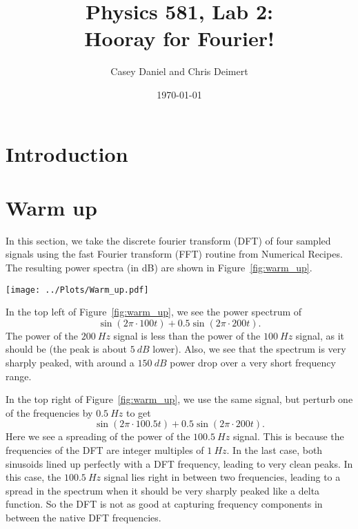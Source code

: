 \documentclass[twocolumn]{myarticle}
\begin{document}
\title{Physics 581, Lab 2:\\Hooray for Fourier!}
\author{Casey Daniel and Chris Deimert}
\date{\today}

\maketitle

\section{Introduction}
\label{sec:introduction}

\section{Warm up}
\label{sec:warm_up}

In this section, we take the discrete fourier transform (DFT) of four sampled signals using the fast Fourier transform (FFT) routine from Numerical Recipes.
The resulting power spectra (in dB) are shown in Figure~\ref{fig:warm_up}.

\begin{figure*}[htpb]
    \centering
    \texttt{[image: ../Plots/Warm\_up.pdf]}
    \caption{%
        The power spectra of the DFT's of four signals.
        Each signal was sampled at $ t = i/1024 $ for $ i = 1, 2, \ldots, 1024 $.
        The frequencies resulting from the discrete Fourier transform are then $ f = -511, -510, \ldots, 512 $.
    }
    \label{fig:warm_up}
\end{figure*}

In the top left of Figure~\ref{fig:warm_up}, we see the power spectrum of 
\[ 
    \sin(2 \pi \cdot 100 t) + 0.5 \sin (2 \pi \cdot 200 t) . 
\]
The power of the $ \SI{200}{Hz} $ signal is less than the power of the $ \SI{100}{Hz} $ signal, as it should be (the peak is about $ \SI{5}{dB} $ lower).
Also, we see that the spectrum is very sharply peaked, with around a $ \SI{150}{dB} $ power drop over a very short frequency range.

In the top right of Figure~\ref{fig:warm_up}, we use the same signal, but perturb one of the frequencies by $ \SI{0.5}{Hz} $ to get
\[
    \sin(2 \pi \cdot 100.5 t) + 0.5 \sin (2 \pi \cdot 200 t) . 
\]
Here we see a spreading of the power of the $ \SI{100.5}{Hz} $ signal.
This is because the frequencies of the DFT are integer multiples of $ \SI{1}{Hz} $.
In the last case, both sinusoids lined up perfectly with a DFT frequency, leading to very clean peaks. 
In this case, the $ \SI{100.5}{Hz} $ signal lies right in between two frequencies, leading to a spread in the spectrum when it should be very sharply peaked like a delta function.
So the DFT is not as good at capturing frequency components in between the native DFT frequencies.
\end{document}

